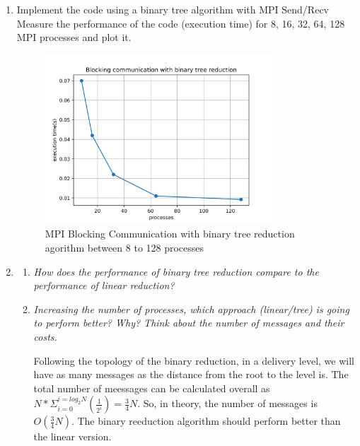 \documentclass[12pt]{article}
\begin{document}
\begin{enumerate}
  \item Implement the code using a binary tree algorithm with MPI Send/Recv
  Measure the performance of the code (execution time) for 8, 16, 32,  64, 128 MPI processes and plot it.

  \begin{figure}[H]
    \centering
    \includegraphics[width=0.8\textwidth]{graph-pi-bin-blocking.png}
    \caption{MPI Blocking Communication with binary tree reduction agorithm between 8 to 128 processes}
    \label{fig:blocking}
  \end{figure}
  \item  
  \begin{enumerate}
    \item \textit{ How does the performance of binary tree reduction compare to the performance of linear reduction? }
    \item \textit{Increasing the number of processes, which approach (linear/tree) is going to perform better? Why? Think about the number of messages and their costs.} 
    
    Following the topology of the binary reduction, in a delivery level, we will have as many messages as the distance from the root to the level is. The total number of meessages can be calculated overall as $N*\Sigma_{i=0}^{i=log_2N}(\frac{1}{2^i}) = \frac{3}{4}N$. So, in theory, the number of messages is $O(\frac{3}{4}N)$. The binary reeduction algorithm should perform better than the linear version.

  \end{enumerate}
 
\end{enumerate}
\end{document}

